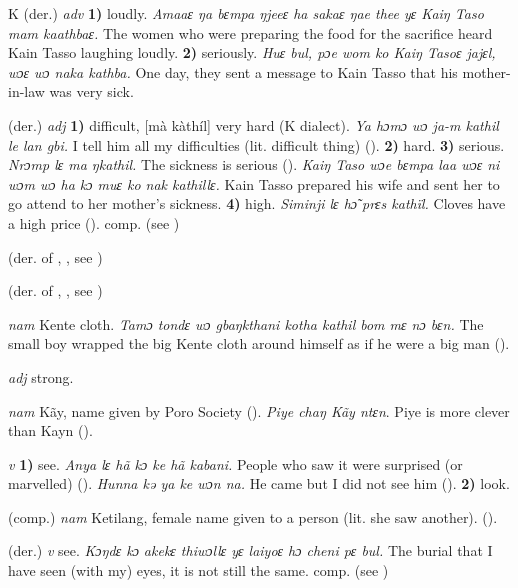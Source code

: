\begin{letter}{K}
 (der.) \textit{adv} \textbf{1)} loudly. \textit{Amaaɛ ŋa bɛmpa ŋjeeɛ ha sakaɛ ŋae thee yɛ Kaiŋ Taso mam kaathbaɛ.} The women who were preparing the food for the sacrifice heard Kain Tasso laughing loudly. \textbf{2)} seriously. \textit{Huɛ bul, pɔe wom ko Kaiŋ Tasoɛ jajɛl, wɔɛ wɔ naka kathba.} One day, they sent a message to Kain Tasso that his mother-in-law was very sick.

 (der.) \textit{adj} \textbf{1)} difficult, [mà kàthíl] very hard (K dialect). \textit{Ya hɔmɔ wɔ ja-m kathil le lan gbi.} I tell him all my difficulties (lit. difficult thing) (\citealt{Pichl1967}). \textbf{2)} hard. \textbf{3)} serious. \textit{Nrɔmp lɛ ma ŋkathil.} The sickness is serious (\citealt{Pichl1967}). \textit{Kaiŋ Taso wɔe bɛmpa laa wɔɛ ni wɔm wɔ ha kɔ muɛ ko nak kathillɛ.} Kain Tasso prepared his wife and sent her to go attend to her mother's sickness. \textbf{4)} high. \textit{Siminji lɛ hɔ̃ prɛs kathïl.} Cloves have a high price (\citealt{Pichl1967}). comp.  (see ) 

 (der. of , , see ) 

 (der. of , , see ) 

 \textit{nam} Kente cloth. \textit{Tamɔ tondɛ wɔ gbaŋkthani kotha kathil bom mɛ nɔ bɛn.} The small boy wrapped the big Kente cloth around himself as if he were a big man (\citealt{Pichl1967}).

 \textit{adj} strong.

 \textit{nam} Kãy, name given by Poro Society (\citealt{Pichl1967}). \textit{Piye chaŋ Kãy ntɛn}. Piye is more clever than Kayn (\citealt{Pichl1967}). 

 \textit{v} \textbf{1)} see. \textit{Anya lɛ hã kɔ ke hã kabani.} People who saw it were surprised (or marvelled) (\citealt{Pichl1967}). \textit{Hunna kə ya ke wɔn na.} He came but I did not see him (\citealt{Pichl1967}). \textbf{2)} look.

 (comp.) \textit{nam} Ketilang, female name given to a person (lit. she saw another). (\citealt{Pichl1967}). 

 (der.) \textit{v} see. \textit{Kɔŋdɛ kɔ akekɛ thiwɔllɛ yɛ laiyoɛ hɔ cheni pɛ bul.} The burial that I have seen (with my) eyes, it is not still the same. comp.  (see )


\end{letter}
